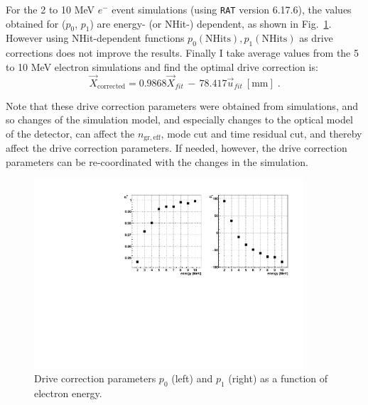 For the 2 to 10 MeV $e^-$ event simulations (using \texttt{RAT} version 6.17.6), the values obtained for ($p_0$, $p_1$) are energy- (or NHit-) dependent, as shown in Fig.~\ref{fig:pullParVsEnergy}. However using NHit-dependent functions $p_0(\mathrm{NHits}), p_1(\mathrm{NHits})$ as drive corrections does not improve the results. Finally I take average values from the 5 to 10 MeV electron simulations and find the optimal drive correction is:
\begin{equation}
\vec{X}_{\mathrm{corrected}} = 0.9868\vec{X}_{fit} \, - \, 78.417\vec{u}_{fit}~\mathrm{[mm]}\;.
\end{equation}

Note that these drive correction parameters were obtained from simulations, and so changes of the simulation model, and especially changes to the optical model of the detector, can affect the $n_\mathrm{gr,eff}$, mode cut and time residual cut, and thereby affect the drive correction parameters. If needed, however, the drive correction parameters can be re-coordinated with the changes in the simulation.

\begin{figure}[!htb]
	\centering
	\includegraphics[width=10cm]{pullParVsEnergy.pdf}
	\caption[Drive correction parameters as a function of electron energy.]{Drive correction parameters $p_0$ (left) and $p_1$ (right) as a function of electron energy. \label{fig:pullParVsEnergy}}
\end{figure}

